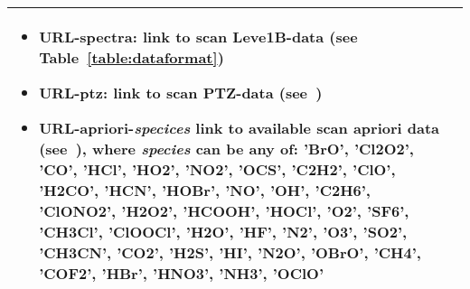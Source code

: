 \begin{table}
\begin{longtable}{| p{} | p{} |}
                            \begin{itemize}
                             \item URL-spectra: link to scan Leve1B-data (see Table~\ref{table:dataformat})
                             \item URL-ptz: link to scan PTZ-data (see~\cite{iodd})
                             \item URL-apriori-\textit{specices} link to available scan apriori data 
                              (see~\cite{iodd}),
                              where \textit{species} can be any of: 'BrO', 'Cl2O2', 'CO', 'HCl', 'HO2', 'NO2',
                              'OCS', 'C2H2', 'ClO', 'H2CO', 'HCN', 'HOBr', 'NO', 'OH', 'C2H6', 'ClONO2', 'H2O2',
                              'HCOOH', 'HOCl', 'O2', 'SF6', 'CH3Cl', 'ClOOCl', 'H2O', 'HF', 'N2', 'O3', 'SO2',
                              'CH3CN', 'CO2', 'H2S', 'HI', 'N2O', 'OBrO', 'CH4', 'COF2', 'HBr', 'HNO3', 'NH3', 'OClO'
                            \end{itemize}
\\ \hline
                                
\hline
\end{longtable}
\end{table}
\addtocounter{table}{-1}
  

\clearpage
\newpage

